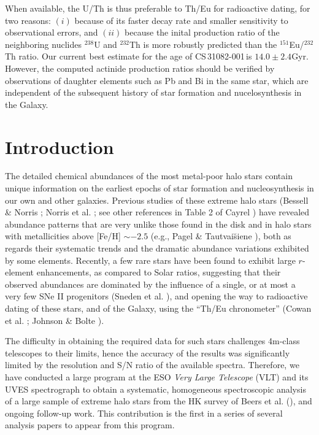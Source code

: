 \documentclass{aa}
\def\cs{CS\,31082-001\,}
\begin{document}
{When available, the U/Th is thus preferable to Th/Eu for radioactive dating, 
for two reasons: $(i)$ because of its faster decay rate and smaller
sensitivity to observational errors, and $(ii)$ because
the inital production ratio of the 
neighboring nuclides $^{238}$U and $^{232}$Th is more robustly predicted than
the $^{151}$Eu/$^{232}$Th ratio.  Our current best estimate for the age of 
\cs is $14.0\pm 2.4$Gyr. However, the computed actinide production ratios 
should be verified by observations of daughter elements such as Pb and Bi in 
the same star, which are independent of the subsequent history of star 
formation and nucelosynthesis in the Galaxy.
}

   \maketitle
%

\section{Introduction} \label{introduction}

The detailed chemical abundances of the most metal-poor halo stars contain
unique information on the earliest epochs of star formation and nucleosynthesis
in our own and other galaxies. Previous studies of these extreme halo stars
(Bessell \& Norris \cite{bessell84}; Norris et al. \cite{norris01}; see other
references in Table 2 of Cayrel \cite{cayrel96}) have revealed abundance
patterns that are very unlike those found in the disk and in halo stars with
metallicities above [Fe/H] $\sim -2.5$ (e.g., Pagel \& Tautvai\u{s}iene
\cite{pagel97}), both as regards their systematic trends and the dramatic
abundance variations exhibited by some elements.  Recently, a few rare stars
have been found to exhibit large $r$-element enhancements, as compared to Solar
ratios, suggesting that their observed abundances are dominated by the influence
of a single, or at most a very few SNe II progenitors (Sneden et al.
\cite{sneden00}), and opening the way to radioactive dating of these stars, and
of the Galaxy, using the ``Th/Eu chronometer'' (Cowan et al.
\cite{cowan99}; Johnson \& Bolte \cite{johnson01}).  

The difficulty in obtaining the required data for such stars challenges
4m-class telescopes to their limits, hence the accuracy of
the results was significantly limited by the resolution and S/N ratio of the
available spectra. Therefore, we have conducted a large program at the ESO {\it
Very Large Telescope} (VLT) and its UVES spectrograph to obtain a systematic,
homogeneous spectroscopic analysis of a large sample of extreme halo stars from
the HK survey of Beers et al. (\cite{beers92}), and ongoing follow-up work. 
This contribution is the first in a series of several analysis papers
to appear from this program. 
\end{document}
